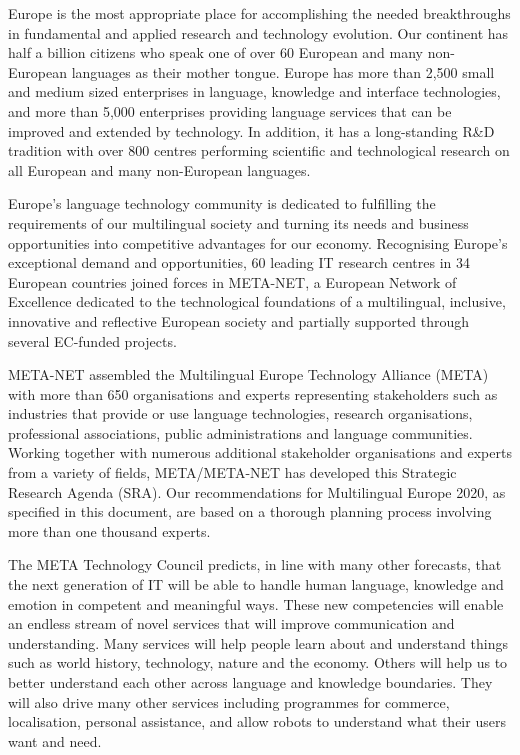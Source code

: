\documentclass[10pt, plain]{../../metanetpaper}
\begin{document}
\begin{multicols}{2}
Europe is the most appropriate place for accomplishing the needed breakthroughs in fundamental and applied research and technology evolution. Our continent has half a billion citizens who speak one of over 60 European and many non-European languages as their mother tongue. Europe has more than 2,500 small and medium sized enterprises in language, knowledge and interface technologies, and more than 5,000 enterprises providing language services that can be improved and extended by technology. In addition, it has a long-standing R\&D tradition with over 800 centres performing scientiﬁc and technological research on all European and many non-European languages.

Europe’s language technology community is dedicated to fulfilling the requirements of our multilingual society and turning its needs and business opportunities into competitive advantages for our economy. Recognising Europe’s exceptional demand and opportunities, 60 leading IT research centres in 34 European countries joined forces in META-NET, a European Network of Excellence dedicated to the technological foundations of a multilingual, inclusive, innovative and reflective European society and partially supported through several EC-funded projects. 
 
META-NET assembled the Multilingual Europe Technology Alliance (META) with more than 650 organisations and experts representing stakeholders such as industries that provide or use language technologies, research organisations, professional associations, public administrations and language communities. Working together with numerous additional stakeholder organisations and experts from a variety of ﬁelds, META/META-NET has developed this Strategic Research Agenda (SRA). Our recommendations for Multilingual Europe 2020, as specified in this document, are based on a thorough planning process involving more than one thousand experts.

The META Technology Council predicts, in line with many other forecasts, that the next generation of IT will be able to handle human language, knowledge and emotion in competent and meaningful ways. These new competencies will enable an endless stream of novel services that will improve communication and understanding. Many services will help people learn about and understand things such as world history, technology, nature and the economy. Others will help us to better understand each other across language and knowledge boundaries. They will also drive many other services including programmes for commerce, localisation, personal assistance, and allow robots to understand what their users want and need.


\end{multicols}
\end{document}
